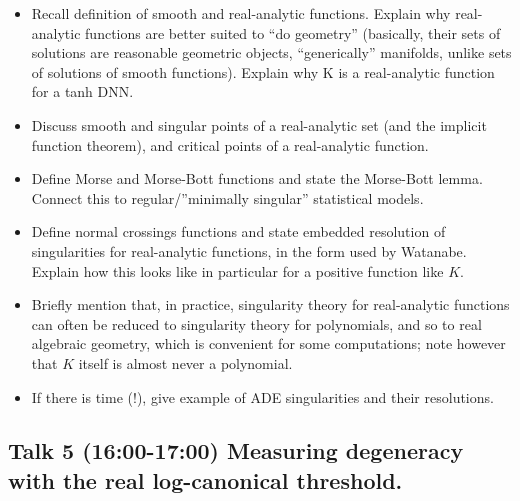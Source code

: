 \documentclass[a4paper,11pt]{amsart}
\begin{document}
\begin{itemize}
\item Recall definition of smooth and real-analytic functions. Explain why real-analytic functions are better suited to ``do geometry'' (basically, their sets of solutions are reasonable geometric objects, ``generically'' manifolds, unlike sets of solutions of smooth functions). Explain why K is a real-analytic function for a tanh DNN. 
\item Discuss smooth and singular points of a real-analytic set (and the implicit function theorem), and critical points of a real-analytic function.
\item Define Morse and Morse-Bott functions and state the Morse-Bott lemma. Connect this to regular/''minimally singular'' statistical models.
\item Define normal crossings functions and state embedded resolution of singularities for real-analytic functions, in the form used by Watanabe. Explain how this looks like in particular for a positive function like $K$.
\item Briefly mention that, in practice, singularity theory for real-analytic functions can often be reduced to singularity theory for polynomials, and so to real algebraic geometry, which is convenient for some computations; note however that $K$ itself is almost never a polynomial.
\item If there is time (!), give example of ADE singularities and their resolutions.
\end{itemize}

\subsection*{Talk 5 (16:00-17:00) Measuring degeneracy with the real log-canonical threshold.}
\end{document}
